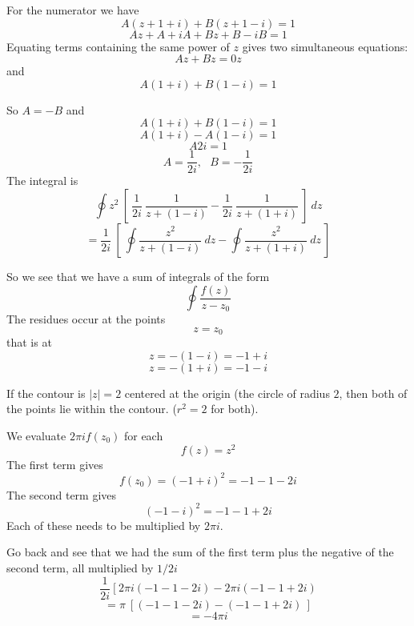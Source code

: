 \documentclass[11pt, oneside]{article}   	%
\begin{document}
For the numerator we have
\[ A(z + 1 + i) + B(z + 1 - i) = 1 \]
\[ Az + A + iA + Bz + B - iB = 1 \]
Equating terms containing the same power of $z$ gives two simultaneous equations:
\[ Az + Bz = 0z \]
and
\[ A(1 + i) + B(1 - i) = 1 \]

So $A = -B$ and
\[ A(1 + i) + B(1 - i) = 1 \]
\[ A (1 + i) - A(1 - i) = 1 \]
\[ A 2i = 1 \]
\[ A = \frac{1}{2i}, \ \ \ B = -\frac{1}{2i} \]
The integral is
\[ \oint z^2 \ [ \ \frac{1}{2i} \ \frac{1}{z + (1 - i)} - \frac{1}{2i} \ \frac{1}{z + (1 + i)} \ ] \ dz \]
\[ = \frac{1}{2i} \ [ \ \oint \frac{z^2}{z + (1 - i)} \ dz - \oint \frac{z^2}{z + (1 + i)} \ dz \ ] \]

So we see that we have a sum of integrals of the form
\[ \oint \frac{f(z)}{z - z_0} \]
The residues occur at the points
\[ z = z_0 \]
that is at 
\[ z = - (1 - i) = -1 + i \]
\[ z = - (1 + i) = -1 - i \]

If the contour is $|z| = 2$ centered at the origin (the circle of radius $2$, then both of the points lie within the contour.  ($ r^2 = 2$ for both).

We evaluate $2 \pi i f(z_0)$ for each
\[ f(z) = z^2 \]
The first term gives
\[ f(z_0) = (-1 + i)^2 =  -1 -1 - 2i \]
The second term gives 
\[ (-1 -i)^2 = -1 - 1 + 2i \]
Each of these needs to be multiplied by $2 \pi i$.

Go back and see that we had the sum of the first term plus the negative of the second term, all multiplied by $1/2i$
\[ \frac{1}{2i} \ [ \ 2 \pi i (-1 -1 - 2i) - 2 \pi i (-1 - 1 + 2i) \]
\[ = \pi \ [ (-1 -1 - 2i) -  (-1 - 1 + 2i) \ ] \]
\[ = -4 \pi i \]
\end{document}
